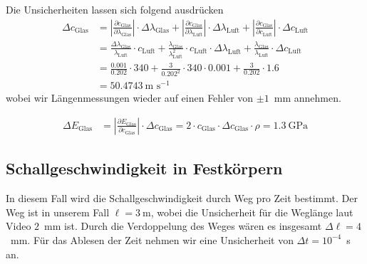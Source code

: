 \documentclass{article}
\begin{document}
Die Unsicherheiten lassen sich folgend ausdrücken
\begin{align}
\Delta c_\text{Glas} &= \left| \frac{\partial c_\text{Glas}}{\partial \lambda_\text{Glas}} \right| \cdot \Delta \lambda_\text{Glas} + \left| \frac{\partial c_\text{Glas}}{\partial \lambda_\text{Luft}} \right| \cdot \Delta \lambda_\text{Luft} + \left| \frac{\partial c_\text{Glas}}{\partial c_\text{Luft}} \right| \cdot \Delta c_\text{Luft} \\
&= \frac{\Delta \lambda_{\text{Glas}}}{\lambda_\text{Luft}} \cdot c_\text{Luft} + \frac{\lambda_{\text{Glas}}}{\lambda_\text{Luft}^2} \cdot c_\text{Luft}\cdot \Delta\lambda_\text{Luft} + \frac{\lambda_{\text{Glas}}}{\lambda_\text{Luft}} \cdot \Delta c_\text{Luft} \\ 
&= \frac{0.001}{0.202}\cdot 340 + \frac{3}{0.202^2}\cdot 340\cdot 0.001 + \frac{3}{0.202}\cdot 1.6 \\
&= 50.4743~\text{m s}^{-1}
\end{align}
wobei wir Längenmessungen wieder auf einen Fehler von $\pm 1$~mm annehmen. 

\begin{align}
\label{eq:emodulglass2}
\Delta E_\text{Glas} &= \left| \frac{\partial E_\text{Glas}}{\partial c_\text{Glas}}\right| \cdot \Delta c_\text{Glas} = 2\cdot c_\text{Glas}\cdot \Delta c_\text{Glas}\cdot \rho = 1.3~\text{GPa}
\end{align}


\subsection{Schallgeschwindigkeit in Festkörpern}

In diesem Fall wird die Schallgeschwindigkeit durch Weg pro Zeit bestimmt. Der Weg ist in unserem Fall $\ell=3~$m, wobei die Unsicherheit für die Weglänge laut Video $2$~mm ist. Durch die Verdoppelung des Weges wären es insgesamt $\Delta\ell=4$~mm. Für das Ablesen der Zeit nehmen wir eine Unsicherheit von $\Delta t = 10^{-4}$~s an.
\end{document}
